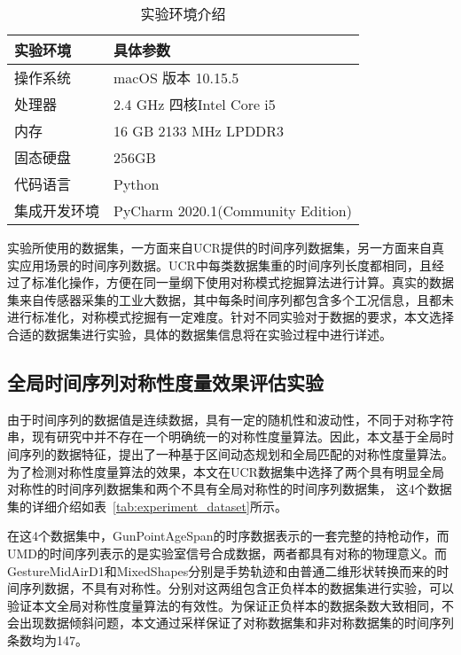 \begin{table}
  \centering
  \caption{实验环境介绍}
  \begin{tabular}{ll}
    \toprule
    实验环境     & 具体参数                          \\
    \midrule
    操作系统     & macOS 版本 10.15.5                \\
    处理器       & 2.4 GHz 四核Intel Core i5         \\
    内存         & 16 GB 2133 MHz LPDDR3             \\
    固态硬盘     & 256GB                             \\
    代码语言     & Python                            \\
    集成开发环境 & PyCharm 2020.1(Community Edition) \\
    \bottomrule
  \end{tabular}
  \label{tab:experiment_enviroment}
\end{table}

实验所使用的数据集，一方面来自UCR提供的时间序列数据集，另一方面来自真实应用场景的时间序列数据。UCR中每类数据集重的时间序列长度都相同，且经过了标准化操作，方便在同一量纲下使用对称模式挖掘算法进行计算。真实的数据集来自传感器采集的工业大数据，其中每条时间序列都包含多个工况信息，且都未进行标准化，对称模式挖掘有一定难度。针对不同实验对于数据的要求，本文选择合适的数据集进行实验，具体的数据集信息将在实验过程中进行详述。

\subsection{全局时间序列对称性度量效果评估实验}
由于时间序列的数据值是连续数据，具有一定的随机性和波动性，不同于对称字符串，现有研究中并不存在一个明确统一的对称性度量算法。因此，本文基于全局时间序列的数据特征，提出了一种基于区间动态规划和全局匹配的对称性度量算法。为了检测对称性度量算法的效果，本文在UCR数据集中选择了两个具有明显全局对称性的时间序列数据集和两个不具有全局对称性的时间序列数据集，
这4个数据集的详细介绍如表~\ref{tab:experiment_dataset}所示。

在这4个数据集中，GunPointAgeSpan的时序数据表示的一套完整的持枪动作，而UMD的时间序列表示的是实验室信号合成数据，两者都具有对称的物理意义。而GestureMidAirD1和MixedShapes分别是手势轨迹和由普通二维形状转换而来的时间序列数据，不具有对称性。分别对这两组包含正负样本的数据集进行实验，可以验证本文全局对称性度量算法的有效性。为保证正负样本的数据条数大致相同，不会出现数据倾斜问题，本文通过采样保证了对称数据集和非对称数据集的时间序列条数均为147。

